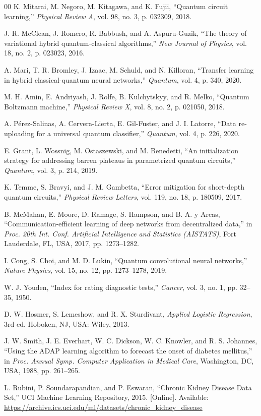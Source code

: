 ﻿\documentclass[conference]{IEEEtran}
\begin{document}
\begin{thebibliography}{00}
K. Mitarai, M. Negoro, M. Kitagawa, and K. Fujii,
``Quantum circuit learning,''
\textit{Physical Review A}, vol. 98, no. 3, p. 032309, 2018.

J. R. McClean, J. Romero, R. Babbush, and A. Aspuru-Guzik,
``The theory of variational hybrid quantum-classical algorithms,''
\textit{New Journal of Physics}, vol. 18, no. 2, p. 023023, 2016.

A. Mari, T. R. Bromley, J. Izaac, M. Schuld, and N. Killoran,
``Transfer learning in hybrid classical-quantum neural networks,''
\textit{Quantum}, vol. 4, p. 340, 2020.

M. H. Amin, E. Andriyash, J. Rolfe, B. Kulchytskyy, and R. Melko,
``Quantum Boltzmann machine,''
\textit{Physical Review X}, vol. 8, no. 2, p. 021050, 2018.

A. P\'{e}rez-Salinas, A. Cervera-Lierta, E. Gil-Fuster, and J. I. Latorre,
``Data re-uploading for a universal quantum classifier,''
\textit{Quantum}, vol. 4, p. 226, 2020.

E. Grant, L. Wossnig, M. Ostaszewski, and M. Benedetti,
``An initialization strategy for addressing barren plateaus in parametrized quantum
circuits,''
\textit{Quantum}, vol. 3, p. 214, 2019.

K. Temme, S. Bravyi, and J. M. Gambetta,
``Error mitigation for short-depth quantum circuits,''
\textit{Physical Review Letters}, vol. 119, no. 18, p. 180509, 2017.

B. McMahan, E. Moore, D. Ramage, S. Hampson, and B. A. y Arcas,
``Communication-efficient learning of deep networks from decentralized data,''
in \textit{Proc. 20th Int. Conf. Artificial Intelligence and Statistics (AISTATS)},
Fort Lauderdale, FL, USA, 2017, pp. 1273--1282.

I. Cong, S. Choi, and M. D. Lukin,
``Quantum convolutional neural networks,''
\textit{Nature Physics}, vol. 15, no. 12, pp. 1273--1278, 2019.

W. J. Youden,
``Index for rating diagnostic tests,''
\textit{Cancer}, vol. 3, no. 1, pp. 32--35, 1950.

D. W. Hosmer, S. Lemeshow, and R. X. Sturdivant,
\textit{Applied Logistic Regression}, 3rd ed.
Hoboken, NJ, USA: Wiley, 2013.

J. W. Smith, J. E. Everhart, W. C. Dickson, W. C. Knowler, and R. S. Johannes,
``Using the ADAP learning algorithm to forecast the onset of diabetes mellitus,''
in \textit{Proc. Annual Symp. Computer Application in Medical Care},
Washington, DC, USA, 1988, pp. 261--265.

L. Rubini, P. Soundarapandian, and P. Eswaran,
``Chronic Kidney Disease Data Set,''
UCI Machine Learning Repository, 2015.
[Online]. Available: \url{https://archive.ics.uci.edu/ml/datasets/chronic_kidney_disease}

\end{thebibliography}
\end{document}
